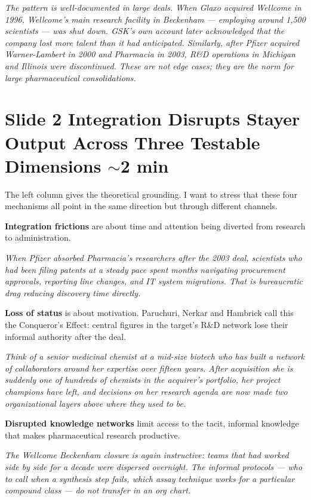 \documentclass[11pt,a4paper]{article}
\newcommand{\example}[1]{%
  \begin{trivlist}
    \item\relax
    \colorbox{examplebg}{\parbox{\dimexpr\linewidth-2\fboxsep}%
      {\small\itshape\color{darkblue!80} #1}}
  \end{trivlist}%
}
\begin{document}
\example{The pattern is well-documented in large deals. When Glaxo acquired Wellcome in 1996, Wellcome's main research facility in Beckenham --- employing around 1,500 scientists --- was shut down. GSK's own account later acknowledged that the company lost more talent than it had anticipated. Similarly, after Pfizer acquired Warner-Lambert in 2000 and Pharmacia in 2003, R\&D operations in Michigan and Illinois were discontinued. These are not edge cases; they are the norm for large pharmaceutical consolidations.}

\section*{Slide 2 \quad Integration Disrupts Stayer Output Across Three Testable Dimensions \hfill{\normalfont\small\color{midgray}$\sim$2 min}}

The left column gives the theoretical grounding. I want to stress that these four mechanisms all point in the same direction but through different channels.

\textbf{Integration frictions} are about time and attention being diverted from research to administration.

\example{When Pfizer absorbed Pharmacia's researchers after the 2003 deal, scientists who had been filing patents at a steady pace spent months navigating procurement approvals, reporting line changes, and IT system migrations. That is bureaucratic drag reducing discovery time directly.}

\textbf{Loss of status} is about motivation. Paruchuri, Nerkar and Hambrick call this the Conqueror's Effect: central figures in the target's R\&D network lose their informal authority after the deal.

\example{Think of a senior medicinal chemist at a mid-size biotech who has built a network of collaborators around her expertise over fifteen years. After acquisition she is suddenly one of hundreds of chemists in the acquirer's portfolio, her project champions have left, and decisions on her research agenda are now made two organizational layers above where they used to be.}

\textbf{Disrupted knowledge networks} limit access to the tacit, informal knowledge that makes pharmaceutical research productive.

\example{The Wellcome Beckenham closure is again instructive: teams that had worked side by side for a decade were dispersed overnight. The informal protocols --- who to call when a synthesis step fails, which assay technique works for a particular compound class --- do not transfer in an org chart.}
\end{document}
